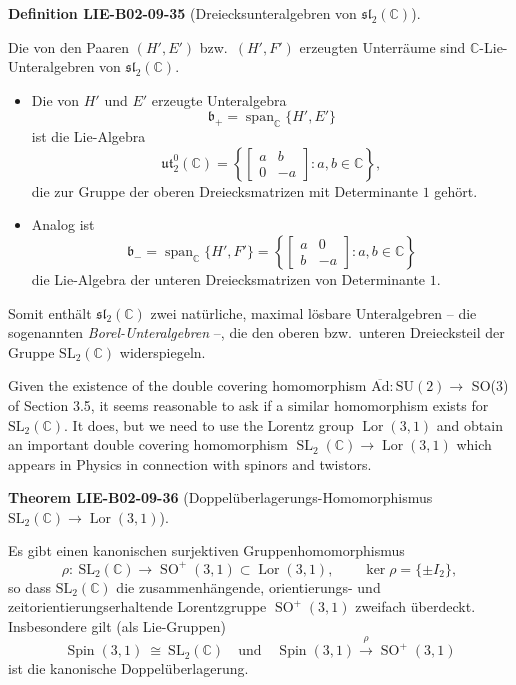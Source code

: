 \documentclass[10pt, letterpaper]{article}
\newcommand{\CustomHeading}[3]{%
  \par\medskip\noindent%
  \textbf{#1 #2} \textnormal{(#3)}.\enskip%
}
\newenvironment{DEF}[2]{\begin{unitbox}\CustomHeading{Definition}{#1}{#2}}{\end{unitbox}}
\newenvironment{THEO}[2]{\begin{unitbox}\CustomHeading{Theorem}{#1}{#2}}{\end{unitbox}}
\begin{document}
\begin{DEF}{LIE-B02-09-35}{Dreiecksunteralgebren von \(\mathfrak{sl}_2(\mathbb{C})\)}
Die von den Paaren \( (H',E') \) bzw.\ \( (H',F') \) erzeugten Unterräume sind
\(\mathbb{C}\)-Lie-Unteralgebren von \(\mathfrak{sl}_2(\mathbb{C})\).

\begin{itemize}
\item
Die von \(H'\) und \(E'\) erzeugte Unteralgebra
\[
\mathfrak{b}_+ = \operatorname{span}_{\mathbb{C}}\{H',E'\}
\]
ist die Lie-Algebra
\[
\mathfrak{ut}_2^{0}(\mathbb{C})
=\left\{
\begin{bmatrix}
a & b\\
0 & -a
\end{bmatrix}
: a,b\in\mathbb{C}
\right\},
\]
die zur Gruppe der oberen Dreiecksmatrizen mit Determinante \(1\) gehört.

\item
Analog ist
\[
\mathfrak{b}_- = \operatorname{span}_{\mathbb{C}}\{H',F'\}
=
\left\{
\begin{bmatrix}
a & 0\\
b & -a
\end{bmatrix}
: a,b\in\mathbb{C}
\right\}
\]
die Lie-Algebra der unteren Dreiecksmatrizen von Determinante \(1\).
\end{itemize}

Somit enthält \(\mathfrak{sl}_2(\mathbb{C})\) zwei natürliche, maximal
lösbare Unteralgebren – die sogenannten \emph{Borel-Unteralgebren} –,
die den oberen bzw.\ unteren Dreiecksteil der Gruppe
\(\mathrm{SL}_2(\mathbb{C})\) widerspiegeln.
\end{DEF}




Given the existence of the double covering homomorphism $\overline{\mathrm{Ad}}: \mathrm{SU}(2) \longrightarrow$ SO(3) of Section 3.5, it seems reasonable to ask if a similar homomorphism exists for $\mathrm{SL}_{2}(\mathbb{C})$. It does, but we need to use the Lorentz group $\operatorname{Lor}(3,1)$ and obtain an important double covering homomorphism $\operatorname{SL}_{2}(\mathbb{C}) \longrightarrow \operatorname{Lor}(3,1)$ which appears in Physics in connection with spinors and twistors.


\begin{THEO}{LIE-B02-09-36}{Doppelüberlagerungs-Homomorphismus \(\mathrm{SL}_2(\mathbb{C})\to \operatorname{Lor}(3,1)\)}
Es gibt einen kanonischen surjektiven Gruppenhomomorphismus
\[
\rho:\ \mathrm{SL}_2(\mathbb{C})\longrightarrow \operatorname{SO}^+(3,1)\subset \operatorname{Lor}(3,1),
\qquad \ker\rho=\{\pm I_2\},
\]
so dass \(\mathrm{SL}_2(\mathbb{C})\) die zusammenhängende, orientierungs- und
zeitorientierungserhaltende Lorentzgruppe \(\operatorname{SO}^+(3,1)\) zweifach überdeckt.
Insbesondere gilt (als Lie-Gruppen)
\[
\operatorname{Spin}(3,1)\ \cong\ \mathrm{SL}_2(\mathbb{C})\quad\text{und}\quad
\operatorname{Spin}(3,1)\xrightarrow{\ \rho\ }\operatorname{SO}^+(3,1)
\]
ist die kanonische Doppelüberlagerung.
\end{THEO}
\end{document}
